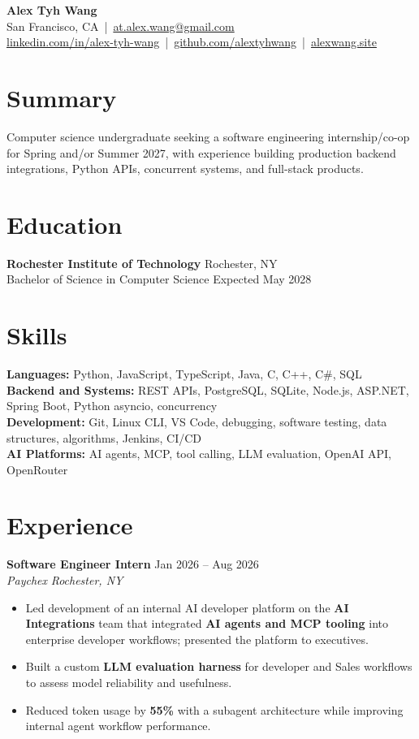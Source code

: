 \documentclass[10pt,letterpaper]{article}
\newif\ifresumeFirstRole
\newcommand{\resumeRole}[4]{%
  \ifresumeFirstRole
    \global\resumeFirstRolefalse
  \else
    \vspace{0pt plus 1fill}%
  \fi
  \textbf{#1} \hfill #2\\
  \textit{#3} \hfill \textit{#4}
}
\begin{document}
\begin{center}
{\Large \textbf{Alex Tyh Wang}}\\
San Francisco, CA \,|\, \href{mailto:at.alex.wang@gmail.com}{at.alex.wang@gmail.com}\\
\small \href{https://www.linkedin.com/in/alex-tyh-wang/}{linkedin.com/in/alex-tyh-wang} \,|\, \href{https://github.com/alextyhwang}{github.com/alextyhwang} \,|\, \href{https://alexwang.site}{alexwang.site}
\end{center}

\section*{Summary}
Computer science undergraduate seeking a software engineering internship/co-op for Spring and/or Summer 2027, with experience building production backend integrations, Python APIs, concurrent systems, and full-stack products.

\section*{Education}
\textbf{Rochester Institute of Technology} \hfill Rochester, NY\\
Bachelor of Science in Computer Science \hfill Expected May 2028

\section*{Skills}
\textbf{Languages:} Python, JavaScript, TypeScript, Java, C, C++, C\#, SQL\\
\textbf{Backend and Systems:} REST APIs, PostgreSQL, SQLite, Node.js, ASP.NET, Spring Boot, Python asyncio, concurrency\\
\textbf{Development:} Git, Linux CLI, VS Code, debugging, software testing, data structures, algorithms, Jenkins, CI/CD\\
\textbf{AI Platforms:} AI agents, MCP, tool calling, LLM evaluation, OpenAI API, OpenRouter

\section*{Experience}
\resumeRole{Software Engineer Intern}{Jan 2026 -- Aug 2026}{Paychex}{Rochester, NY}
\begin{itemize}
  \item Led development of an internal AI developer platform on the \textbf{AI Integrations} team that integrated \textbf{AI agents and MCP tooling} into enterprise developer workflows; presented the platform to executives.
  \item Built a custom \textbf{LLM evaluation harness} for developer and Sales workflows to assess model reliability and usefulness.
  \item Reduced token usage by \textbf{55\%} with a subagent architecture while improving internal agent workflow performance.
\end{itemize}
\end{document}
